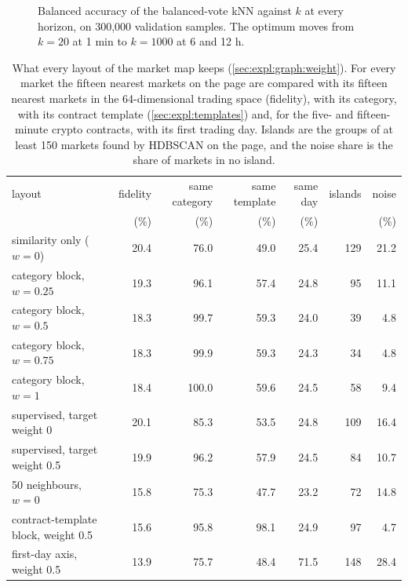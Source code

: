 \begin{figure}[p]
\centering
\resizebox{\textwidth}{!}{}
\caption{Balanced accuracy of the balanced-vote kNN against $k$ at every horizon, on
300{,}000 validation samples.  The optimum moves from $k = 20$ at 1 min to $k = 1000$ at
6 and 12 h.}
\label{fig:structure:knn}
\end{figure}

\begin{table}[t]
\centering
\caption{What every layout of the market map keeps (\cref{sec:expl:graph:weight}).  For
every market the fifteen nearest markets on the page are compared with its fifteen nearest
markets in the 64-dimensional trading space (fidelity), with its category, with its
contract template (\cref{sec:expl:templates}) and, for the five- and fifteen-minute crypto
contracts, with its first trading day.  Islands are the groups of at least 150 markets
found by HDBSCAN on the page, and the noise share is the share of markets in no island.}
\label{tab:graph:mapmetrics}
\small
\begin{fittable}\begin{tabular}{lrrrrrr}
\toprule
layout & fidelity & same category & same template & same day & islands & noise \\
 & (\%) & (\%) & (\%) & (\%) & & (\%) \\
\midrule
similarity only ($w = 0$) & 20.4 & 76.0 & 49.0 & 25.4 & 129 & 21.2 \\
category block, $w = 0.25$ & 19.3 & 96.1 & 57.4 & 24.8 & 95 & 11.1 \\
category block, $w = 0.5$ & 18.3 & 99.7 & 59.3 & 24.0 & 39 & 4.8 \\
category block, $w = 0.75$ & 18.3 & 99.9 & 59.3 & 24.3 & 34 & 4.8 \\
category block, $w = 1$ & 18.4 & 100.0 & 59.6 & 24.5 & 58 & 9.4 \\
supervised, target weight 0 & 20.1 & 85.3 & 53.5 & 24.8 & 109 & 16.4 \\
supervised, target weight 0.5 & 19.9 & 96.2 & 57.9 & 24.5 & 84 & 10.7 \\
50 neighbours, $w = 0$ & 15.8 & 75.3 & 47.7 & 23.2 & 72 & 14.8 \\
contract-template block, weight 0.5 & 15.6 & 95.8 & 98.1 & 24.9 & 97 & 4.7 \\
first-day axis, weight 0.5 & 13.9 & 75.7 & 48.4 & 71.5 & 148 & 28.4 \\
\bottomrule
\end{tabular}\end{fittable}
\end{table}

